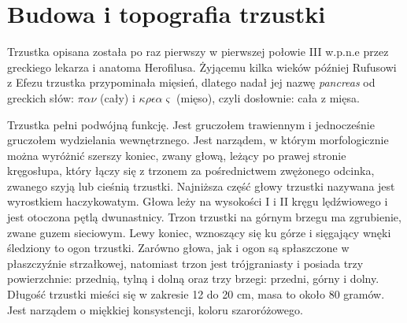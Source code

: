 \documentclass[a4paper, 12pt]{report}
\begin{document}
\chapter{Budowa i topografia trzustki}

Trzustka opisana została po raz pierwszy w pierwszej połowie III
w.p.n.e przez greckiego lekarza i anatoma Herofilusa. Żyjącemu kilka 
wieków później Rufusowi z Efezu trzustka przypominała mięsień,
dlatego nadał jej nazwę \textsl{pancreas} od greckich słów:
$\pi\alpha\nu$ (cały) i $\kappa\rho\epsilon\alpha\varsigma$ (mięso), 
czyli dosłownie: cała z mięsa\cite{bochenek}.

Trzustka pełni podwójną funkcję. Jest gruczołem trawiennym i
jednocześnie gruczołem wydzielania wewnętrznego. Jest narządem, w którym
morfologicznie można wyróżnić szerszy koniec, zwany głową, leżący po
prawej stronie kręgosłupa, który łączy się z trzonem za pośrednictwem
zwężonego odcinka, zwanego szyją lub cieśnią trzustki. Najniższa część
głowy trzustki nazywana jest wyrostkiem haczykowatym. Głowa leży na
wysokości I i II kręgu lędźwiowego i jest otoczona pętlą dwunastnicy. 
Trzon trzustki na górnym brzegu ma zgrubienie, zwane guzem sieciowym. Lewy koniec,
wznoszący się ku górze i sięgający wnęki śledziony to ogon trzustki.
Zarówno głowa, jak i ogon są spłaszczone w płaszczyźnie strzałkowej,
natomiast trzon jest trójgraniasty i posiada trzy powierzchnie:
przednią, tylną i dolną oraz trzy brzegi: przedni, górny i dolny.
Długość trzustki mieści się w zakresie 12 do 20 cm, masa to około 80
gramów. Jest narządem o miękkiej konsystencji, koloru szaroróżowego.
\end{document}
